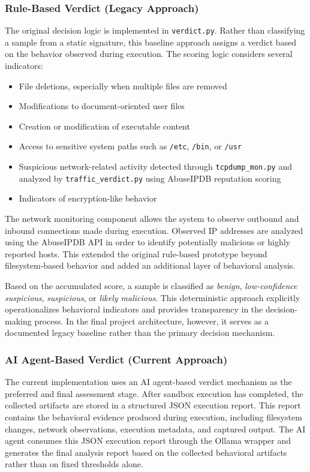 \subsubsection{Rule-Based Verdict (Legacy Approach)}
\noindent
The original decision logic is implemented in \texttt{verdict.py}. Rather than classifying a sample from a static signature, this baseline approach assigns a verdict based on the behavior observed during execution. The scoring logic considers several indicators:
\begin{itemize}
    \item File deletions, especially when multiple files are removed
    \item Modifications to document-oriented user files
    \item Creation or modification of executable content
    \item Access to sensitive system paths such as \texttt{/etc}, \texttt{/bin}, or \texttt{/usr}
    \item Suspicious network-related activity detected through \texttt{tcpdump\_mon.py} and analyzed by \texttt{traffic\_verdict.py} using AbuseIPDB reputation scoring
    \item Indicators of encryption-like behavior
\end{itemize}
 
\noindent
The network monitoring component allows the system to observe outbound and inbound connections made during execution. Observed IP addresses are analyzed using the AbuseIPDB API in order to identify potentially malicious or highly reported hosts. This extended the original rule-based prototype beyond filesystem-based behavior and added an additional layer of behavioral analysis.
 
\vspace{1em}
 
Based on the accumulated score, a sample is classified as \textit{benign}, \textit{low-confidence suspicious}, \textit{suspicious}, or \textit{likely malicious}. This deterministic approach explicitly operationalizes behavioral indicators and provides transparency in the decision-making process. In the final project architecture, however, it serves as a documented legacy baseline rather than the primary decision mechanism.
 
\subsubsection{AI Agent-Based Verdict (Current Approach)}
\noindent
The current implementation uses an AI agent-based verdict mechanism as the preferred and final assessment stage. After sandbox execution has completed, the collected artifacts are stored in a structured JSON execution report. This report contains the behavioral evidence produced during execution, including filesystem changes, network observations, execution metadata, and captured output. The AI agent consumes this JSON execution report through the Ollama wrapper and generates the final analysis report based on the collected behavioral artifacts rather than on fixed thresholds alone.
 
